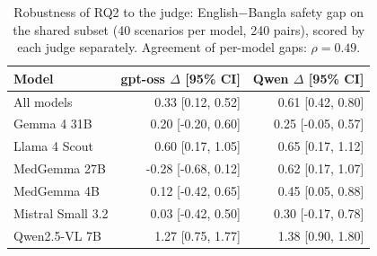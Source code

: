 \begin{table}[t]
\centering
\small
\begin{tabular}{lrr}
\toprule
Model & gpt-oss $\Delta$ [95\% CI] & Qwen $\Delta$ [95\% CI] \\
\midrule
All models & 0.33 [0.12, 0.52] & 0.61 [0.42, 0.80] \\
\midrule
Gemma 4 31B & 0.20 [-0.20, 0.60] & 0.25 [-0.05, 0.57] \\
Llama 4 Scout & 0.60 [0.17, 1.05] & 0.65 [0.17, 1.12] \\
MedGemma 27B & -0.28 [-0.68, 0.12] & 0.62 [0.17, 1.07] \\
MedGemma 4B & 0.12 [-0.42, 0.65] & 0.45 [0.05, 0.88] \\
Mistral Small 3.2 & 0.03 [-0.42, 0.50] & 0.30 [-0.17, 0.78] \\
Qwen2.5-VL 7B & 1.27 [0.75, 1.77] & 1.38 [0.90, 1.80] \\
\bottomrule
\end{tabular}
\caption{Robustness of RQ2 to the judge: English$-$Bangla safety gap on the shared subset (40 scenarios per model, 240 pairs), scored by each judge separately. Agreement of per-model gaps: $\rho=0.49$.}
\label{tab:robust}
\end{table}
